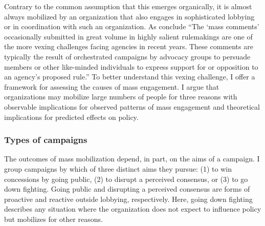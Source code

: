 Contrary to the common assumption that this emerges organically, it is almost always mobilized by an organization that also engages in sophisticated lobbying or in coordination with such an organization. %
As \citet{SantAmbrogio2018} conclude ``The `mass comments' occasionally submitted in great volume in highly salient rulemakings are one of the more vexing challenges facing agencies in recent years. These comments are typically the result of orchestrated campaigns by advocacy groups to persuade members or other like-minded individuals to express support for or opposition to an agency's proposed rule.'' %
To better understand this vexing challenge, I offer a framework for assessing the causes of mass engagement. %
I argue that organizations may mobilize large numbers of people for three reasons with observable implications for observed patterns of mass engagement and theoretical implications for predicted effects on policy. 

\subsubsection{Types of campaigns} The outcomes of mass mobilization depend, in part, on the aims of a campaign. I group campaigns by which of three distinct aims they pursue: (1) to win concessions by going public, (2) to disrupt a perceived consensus, or (3) to go down fighting. Going public and disrupting a perceived consensus are forms of proactive and reactive outside lobbying, respectively. Here, going down fighting describes any situation where the organization does not expect to influence policy but mobilizes for other reasons. 

